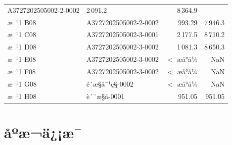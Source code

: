 \documentclass[UTF8,10pt,a4paper,fontset=fandol]{ctexart}
\newcommand{\fieldvalue}[1]{#1}
\begin{document}
\begin{tabularx}{\textwidth}{@{}lXrr@{}}
\fieldvalue{A3727202505002-2-0002} &
\fieldvalue{2\,091.2} &
\fieldvalue{8\,364.9}\\
æ ¹1 B08 &
\fieldvalue{A3727202505002-2-0002} &
\fieldvalue{993.29} &
\fieldvalue{7\,946.3}\\
æ ¹1 C08 &
\fieldvalue{A3727202505002-3-0001} &
\fieldvalue{2\,177.5} &
\fieldvalue{8\,710.2}\\
æ ¹1 D08 &
\fieldvalue{A3727202505002-3-0002} &
\fieldvalue{1\,081.3} &
\fieldvalue{8\,650.3}\\
æ ¹1 E08 &
\fieldvalue{A3727202505002-3-0002} &
\fieldvalue{$<$ æå°å¼} &
\fieldvalue{NaN}\\
æ ¹1 F08 &
\fieldvalue{A3727202505002-3-0002} &
\fieldvalue{$<$ æå°å¼} &
\fieldvalue{NaN}\\
æ ¹1 G08 &
\fieldvalue{é´æ§å¯¹ç§-0002} &
\fieldvalue{$<$ æå°å¼} &
\fieldvalue{NaN}\\
æ ¹1 H08 &
\fieldvalue{è´¨æ§å-0001} &
\fieldvalue{951.05} &
\fieldvalue{951.05}
\end{tabularx}

\section{åºæ¬ä¿¡æ¯}
\end{document}
